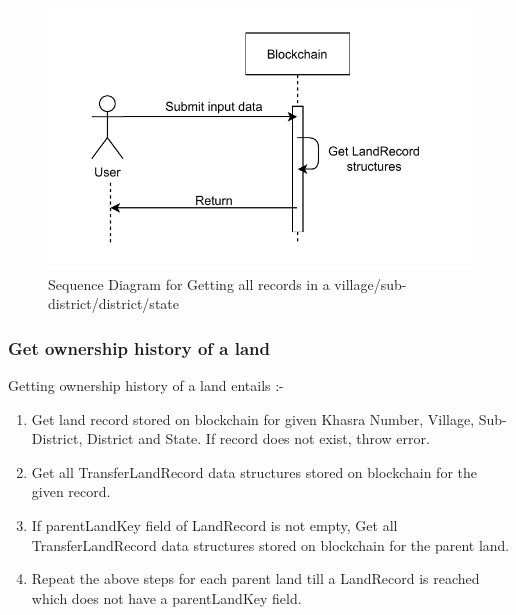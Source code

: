 \documentclass{article}
\begin{document}
        \begin{figure}[htbp]
            \includegraphics[scale=0.25]{blockchain_seq_get_records}
            \centering
            \caption{Sequence Diagram for Getting all records in a village/sub-district/district/state}
        \end{figure}


    \subsubsection{Get ownership history of a land}
        Getting ownership history of a land entails :-
        \begin{enumerate}
            \item Get land record stored on blockchain for given Khasra Number, Village, Sub-District, District and State. If record does not exist, throw error.
            \item Get all TransferLandRecord data structures stored on blockchain for the given record.
            \item If parentLandKey field of LandRecord is not empty, Get all TransferLandRecord data structures stored on blockchain for the parent land.
            \item Repeat the above steps for each parent land till a LandRecord is reached which does not have a parentLandKey field. 
        \end{enumerate}
\end{document}
